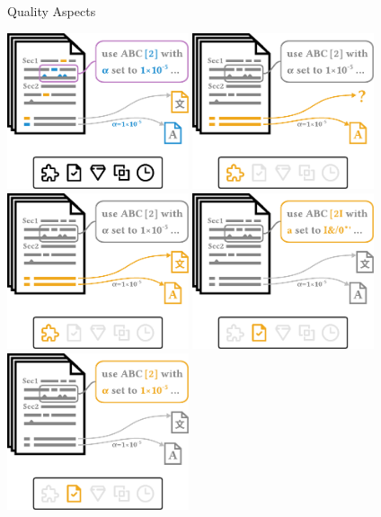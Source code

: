 \documentclass[en,16:9,smallfoot]{sdqbeamer}
\begin{document}
   \begin{frame}{Quality Aspects}
       \begin{overprint}
            \centering\includegraphics[width=0.4\textwidth]{imgs/schema_asp_x_x}
            \centering\includegraphics[width=0.4\textwidth]{imgs/schema_asp_0_0}
            \centering\includegraphics[width=0.4\textwidth]{imgs/schema_asp_0_1}
            \centering\includegraphics[width=0.4\textwidth]{imgs/schema_asp_1_0}
            \centering\includegraphics[width=0.4\textwidth]{imgs/schema_asp_1_1}

\end{overprint}
\end{frame}
\end{document}
